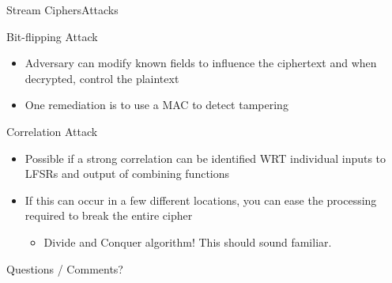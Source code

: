 \documentclass[12pt]{beamer}
\begin{document}
\begin{frame}{Stream Ciphers}{Attacks}
\begin{block}{Bit-flipping Attack}
\begin{itemize}
	\item Adversary can modify known fields to influence the ciphertext and when decrypted, control the plaintext
	\item One remediation is to use a MAC to detect tampering
\end{itemize}
\end{block}
\begin{block}{Correlation Attack}
\begin{itemize}
	\item Possible if a strong correlation can be identified WRT individual inputs to LFSRs and output of combining functions
	\item If this can occur in a few different locations, you can ease the processing required to break the entire cipher
	\begin{itemize}
		\item Divide and Conquer algorithm! This should sound familiar.
	\end{itemize}
\end{itemize}
\end{block}
\end{frame}

\begin{frame}{Questions / Comments?}{}
\end{frame}
\end{document}
